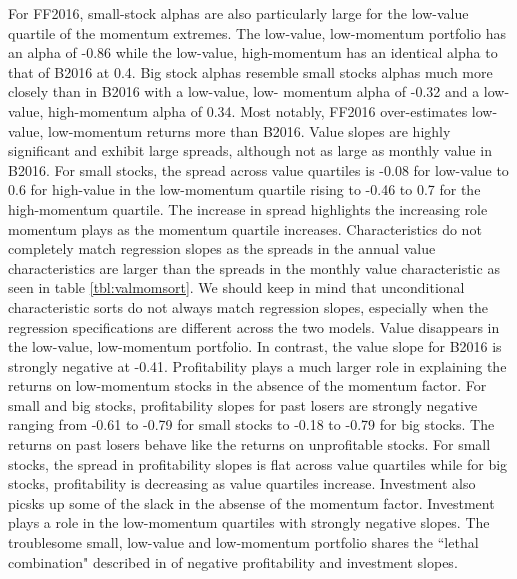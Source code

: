 For FF2016, small-stock alphas are also particularly large for the low-value quartile of
the momentum extremes. The low-value, low-momentum portfolio has an alpha of -0.86 while
the low-value, high-momentum has an identical alpha to that of B2016 at 0.4. Big stock
alphas resemble small stocks alphas much more closely than in B2016 with a low-value, low-
momentum alpha of -0.32 and a low-value, high-momentum alpha of 0.34. Most notably, FF2016
over-estimates low-value, low-momentum returns more than B2016. Value slopes are highly
significant and exhibit large spreads, although not as large as monthly value in B2016.
For small stocks, the spread across value quartiles is -0.08 for low-value to 0.6 for
high-value in the low-momentum quartile rising to -0.46 to 0.7 for the high-momentum
quartile. The increase in spread highlights the increasing role momentum plays as the
momentum quartile increases. Characteristics do not completely match regression slopes as
the spreads in the annual value characteristics are larger than the spreads in the monthly
value characteristic as seen in table \ref{tbl:valmomsort}. We should keep in mind that
unconditional characteristic sorts do not always match regression slopes, especially when
the regression specifications are different across the two models. Value disappears in the
low-value, low-momentum portfolio. In contrast, the value slope for B2016 is strongly
negative at -0.41. Profitability plays a much larger role in explaining the returns on
low-momentum stocks in the absence of the momentum factor. For small and big stocks,
profitability slopes for past losers are strongly negative ranging from -0.61 to -0.79 for
small stocks to -0.18 to -0.79 for big stocks. The returns on past losers behave like the
returns on unprofitable stocks. For small stocks, the spread in profitability slopes is
flat across value quartiles while for big stocks, profitability is decreasing as value
quartiles increase. Investment also picsks up some of the slack in the absense of the
momentum factor. Investment plays a role in the low-momentum quartiles with strongly
negative slopes. The troublesome small, low-value and low-momentum portfolio shares the
``lethal combination" described in \textcite{fama2015five} of negative profitability and
investment slopes.
